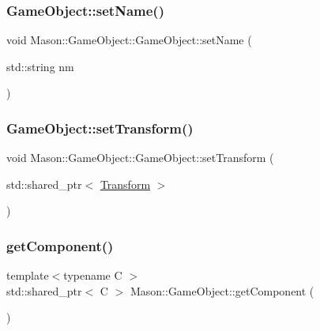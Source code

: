 \subsubsection{\texorpdfstring{Game\+Object\+::set\+Name()}{GameObject::setName()}}
{\footnotesize\ttfamily void Mason\+::\+Game\+Object\+::\+Game\+Object\+::set\+Name (\begin{DoxyParamCaption}\item[{std\+::string}]{nm }\end{DoxyParamCaption})}

\hypertarget{class_mason_1_1_game_object_a2e0211a7054aa98fd9abec583056e778}{}\label{class_mason_1_1_game_object_a2e0211a7054aa98fd9abec583056e778} 
\subsubsection{\texorpdfstring{Game\+Object\+::set\+Transform()}{GameObject::setTransform()}}
{\footnotesize\ttfamily void Mason\+::\+Game\+Object\+::\+Game\+Object\+::set\+Transform (\begin{DoxyParamCaption}\item[{std\+::shared\+\_\+ptr$<$ \hyperlink{class_mason_1_1_transform}{Transform} $>$}]{ }\end{DoxyParamCaption})}

\hypertarget{class_mason_1_1_game_object_aa716fbc3fd56fe4f65c85d777ac62eb0}{}\label{class_mason_1_1_game_object_aa716fbc3fd56fe4f65c85d777ac62eb0} 
\subsubsection{\texorpdfstring{get\+Component()}{getComponent()}}
{\footnotesize\ttfamily template$<$typename C $>$ \\
std\+::shared\+\_\+ptr$<$ C $>$ Mason\+::\+Game\+Object\+::get\+Component (\begin{DoxyParamCaption}{ }\end{DoxyParamCaption})}

\hypertarget{class_mason_1_1_game_object_a4c013ffa8f4925e42541b462490e4dca}{}\label{class_mason_1_1_game_object_a4c013ffa8f4925e42541b462490e4dca} 
